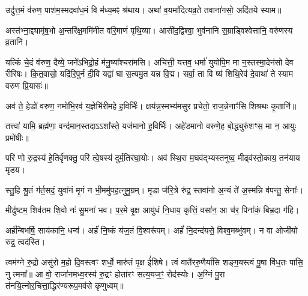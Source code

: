
उदु॑त्त॒मं व॑रुण॒ पाश॑\-म॒स्मद\-वा॑ध॒मं वि म॑ध्य॒मꣴ श्र॑थाय। अथा॑ व॒यमा॑दित्यव्र॒ते तवाना॑गसो॒ अदि॑तये स्याम॥



अस्त॑भ्ना॒द्द्यामृ॑ष॒भो अ॒न्तरि॑क्ष॒ममि॑मीत वरि॒माणं॑ पृथि॒व्या। आसी॑द॒द्विश्वा॒ भुव॑नानि स॒म्राड्विश्वेत्तानि॒ वरु॑णस्य व्र॒तानि॑।



यत्किं चे॒दं व॑रुण॒ दैव्ये॒ जने॑\-ऽभिद्रो॒हं म॑नु॒ष्या᳚श्चरा॑मसि। अचि॑त्ती॒ यत्तव॒ धर्मा॑ युयोपि॒म मा न॒स्तस्मा॒देन॑सो देव रीरिषः। कि॒त॒वासो॒ यद्रि॑रि॒पुर्न दी॒वि यद्वा॑ घा स॒त्यमु॒त यन्न वि॒द्म। सर्वा॒ ता वि ष्य॑ शिथि॒रेव॑ दे॒वाथा॑ ते स्याम वरुण प्रि॒यासः॑॥


अव॑ ते॒ हेडो॑ वरुण॒ नमो॑\-भि॒रव॑ य॒ज्ञेभि॑रीमहे ह॒विर्भिः॑। क्षय॑न्न॒स्मभ्य॑मसुर प्रचेतो॒ राज॒न्नेनाꣳ॑सि शिश्रथः कृ॒तानि॑॥


तत्त्वा॑ यामि॒ ब्रह्म॑णा॒ वन्द॑मान॒स्तदाऽऽशा᳚स्ते॒ यज॑मानो ह॒विर्भिः॑। अहे॑डमानो वरुणे॒ह बो॒द्ध्युरु॑शꣳस॒ मा न॒ आयुः॒ प्रमो॑षीः॥



परि॑ णो रु॒द्रस्य॑ हे॒तिर्वृ॑णक्तु॒ परि॑ त्वे॒षस्य॑ दुर्म॒तिर॑घा॒योः। अव॑ स्थि॒रा म॒घव॑द्भ्यस्तनुष्व॒ मीढ्व॑स्तो॒काय॒ तन॑याय मृडय।


स्तु॒हि श्रु॒तं ग॑र्त॒सदं॒ युवा॑नं मृ॒गं न भी॒ममु॑पह॒त्नुमु॒ग्रम्। मृ॒डा ज॑रि॒त्रे रु॑द्र॒ स्तवा॑नो अ॒न्यं ते॑ अ॒स्मन्नि व॑पन्तु॒ सेनाः᳚।


मीढु॑ष्टम॒ शिव॑तम शि॒वो नः॑ सु॒मना॑ भव। प॒र॒मे वृ॒क्ष आयु॑धं नि॒धाय॒ कृत्तिं॒ वसा॑न॒ आ च॑र॒ पिना॑कं॒ बिभ्र॒दा ग॑हि।


अर्\mbox{}ह॑न्बिभर्\mbox{}षि॒ साय॑कानि॒ धन्व॑। 
अर्\mbox{}हं॑ नि॒ष्कं य॑ज॒तं  वि॒श्वरू॑पम्। 
अर्\mbox{}हं॑ नि॒दन्द॑यसे॒ विश्व॒मब्भु॑वम्। 
न वा ओजी॑यो रुद्र॒ त्वद॑स्ति। 


त्वम॑ग्ने रु॒द्रो असु॑रो म॒हो दि॒वस्त्वꣳ शर्धो॒ मारु॑तं पृ॒क्ष ई॑शिषे। त्वं वातै॑ररु॒णैर्या॑सि शङ्ग॒यस्त्वं पू॒षा वि॑ध॒तः पा॑सि॒ नु त्मना᳚॥
आ वो॒ राजा॑नमध्व॒रस्य॑ रु॒द्रꣳ होता॑रꣳ सत्य॒यज॒ꣳ॒ रोद॑स्योः। अ॒ग्निं पु॒रा त॑नयि॒त्नोर॒चित्ता॒द्धिर॑ण्यरूप॒मव॑से कृणुध्वम्॥



